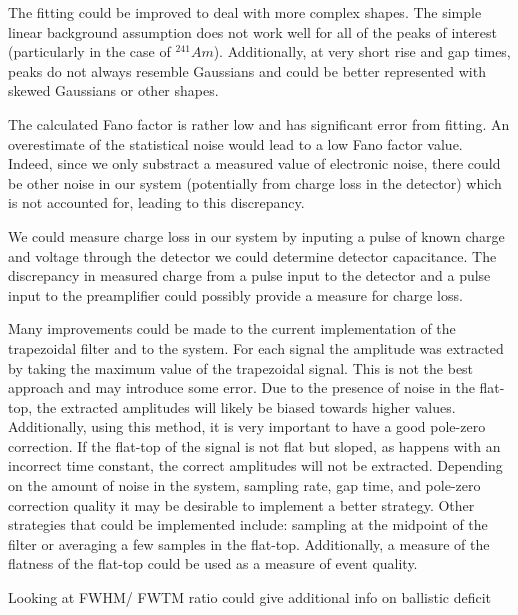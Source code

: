 The fitting could be improved to deal with more complex shapes. The simple linear background assumption does not work well for all of the peaks of interest (particularly in the case of  ${}^{241}Am$). Additionally, at very short rise and gap times, peaks do not always resemble Gaussians and could be better represented with skewed Gaussians or other shapes. 


The calculated Fano factor is rather low and has significant error from fitting. An overestimate of the statistical noise would lead to a low Fano factor value. Indeed, since we only substract a measured value of electronic noise, there could be other noise in our system (potentially from charge loss in the detector) which is not accounted for, leading to this discrepancy.

We could measure charge loss in our system by inputing a pulse of known charge and voltage through the detector we could determine detector capacitance. The discrepancy in measured charge from a pulse input to the detector and a pulse input to the preamplifier could possibly provide a measure for charge loss.

Many improvements could be made to the current implementation of the trapezoidal filter and to the system. For each signal the amplitude was extracted by taking the maximum value of the trapezoidal signal. This is not the best approach and may introduce some error. Due to the presence of noise in the flat-top, the extracted amplitudes will likely be biased towards higher values. Additionally, using this method, it is very important to have a good pole-zero correction. If the flat-top of the signal is not flat but sloped, as happens with an incorrect time constant, the correct amplitudes will not be extracted. Depending on the amount of noise in the system, sampling rate, gap time, and pole-zero correction quality it may be desirable to implement a better strategy. Other strategies that could be implemented include: sampling at the midpoint of the filter or averaging a few samples in the flat-top. Additionally, a measure of the flatness of the flat-top could be used as a measure of event quality.

Looking at FWHM/ FWTM ratio could give additional info on ballistic deficit
